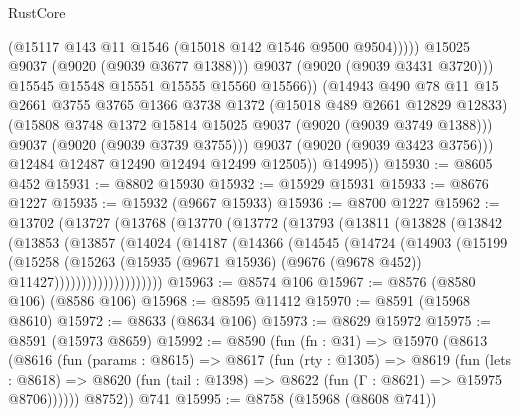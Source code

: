 \begin{lexlean}{RustCore}
\begin{coremodule}
                            (@15117 @143 @11 @1546 (@15018 @142 @1546 @9500 @9504)))))
                      @15025
                      @9037
                      (@9020 (@9039 @3677 @1388)))
                    @9037
                    (@9020 (@9039 @3431 @3720)))
                  @15545
                  @15548
                  @15551
                  @15555
                  @15560
                  @15566))
              (@14943
                @490
                @78
                @11
                @15
                @2661
                @3755
                @3765
                @1366
                @3738
                @1372
                (@15018 @489 @2661 @12829 @12833)
                (@15808 @3748 @1372 @15814 @15025 @9037 (@9020 (@9039 @3749 @1388)))
                @9037
                (@9020 (@9039 @3739 @3755)))
              @9037
              (@9020 (@9039 @3423 @3756)))
            @12484
            @12487
            @12490
            @12494
            @12499
            @12505))
        @14995))
@15930 := @8605 @452
@15931 := @8802 @15930
@15932 := @15929 @15931
@15933 := @8676 @1227
@15935 := @15932 (@9667 @15933)
@15936 := @8700 @1227
@15962 := @13702
    (@13727
      (@13768
        (@13770
          (@13772
            (@13793
              (@13811
                (@13828
                  (@13842
                    (@13853
                      (@13857
                        (@14024
                          (@14187
                            (@14366
                              (@14545
                                (@14724
                                  (@14903
                                    (@15199
                                      (@15258
                                        (@15263
                                          (@15935
                                            (@9671 @15936)
                                            (@9676 (@9678 @452))
                                            @11427))))))))))))))))))))
@15963 := @8574 @106
@15967 := @8576 (@8580 @106) (@8586 @106)
@15968 := @8595 @11412
@15970 := @8591 (@15968 @8610)
@15972 := @8633 (@8634 @106)
@15973 := @8629 @15972
@15975 := @8591 (@15973 @8659)
@15992 := @8590
    (fun (fn : @31) =>
    @15970
      (@8613
        (@8616
          (fun (params : @8615) =>
          @8617
            (fun (rty : @1305) =>
            @8619
              (fun (lets : @8618) =>
              @8620 (fun (tail : @1398) => @8622 (fun (Γ : @8621) => @15975 @8706))))))
        @8752))
    @741
@15995 := @8758 (@15968 (@8608 @741))

\end{coremodule}
\end{lexlean}
